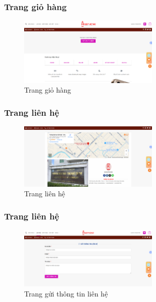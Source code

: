 \subsubsection{Trang giỏ hàng}
\begin{figure}[H]
    \centering
    \includegraphics[width=0.6\textwidth]{img/giohang.png}
    \caption{Trang giỏ hàng}
    \label{fig:giohang}
\end{figure}

\subsubsection{Trang liên hệ}
\begin{figure}[H]
    \centering
    \includegraphics[width=0.6\textwidth]{img/lienhe.png}
    \caption{Trang liên hệ}
    \label{fig:lh}
\end{figure}

\subsubsection{Trang liên hệ}
\begin{figure}[H]
    \centering
    \includegraphics[width=0.6\textwidth]{img/guithongtinlienhe.png}
    \caption{Trang gửi thông tin liên hệ}
    \label{fig:noibat}
\end{figure}

